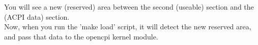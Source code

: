 \begin{flushleft}
You will see a new (reserved) area between the second (useable) section and the
(ACPI data) section.\\

Now, when you run the 'make load' script, it will detect the new reserved
area, and pass that data to the opencpi kernel module. \\
\end{flushleft}
